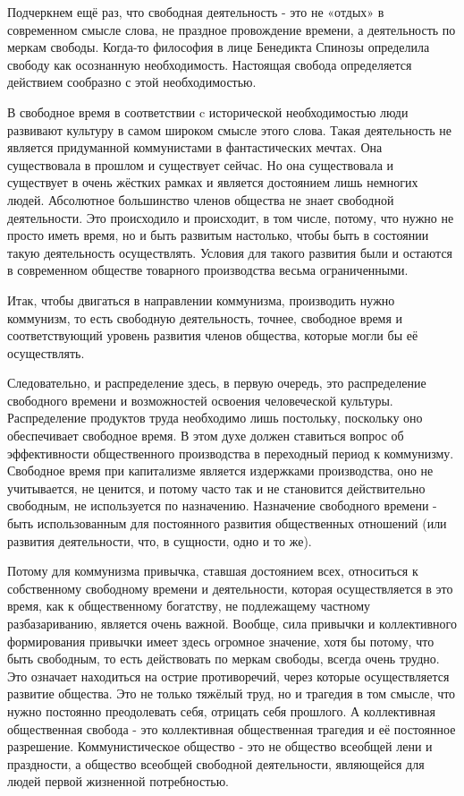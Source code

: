 \documentclass[12pt,a4paper,openany]{book}
\begin{document}
Подчеркнем ещё раз, что свободная деятельность - это не «отдых» в современном смысле слова, не праздное провождение времени, а деятельность по меркам свободы. Когда-то философия в лице Бенедикта Спинозы определила свободу как осознанную необходимость. Настоящая свобода определяется действием сообразно с этой необходимостью.

В свободное время в соответствии c исторической необходимостью люди развивают культуру в самом широком смысле этого слова. Такая деятельность не является придуманной коммунистами в фантастических мечтах. Она существовала в прошлом и существует сейчас. Но она существовала и существует в очень жёстких рамках и является достоянием лишь немногих людей. Абсолютное большинство членов общества не знает свободной деятельности. Это происходило и происходит, в том числе, потому, что нужно не просто иметь время, но и быть развитым настолько, чтобы быть в состоянии такую деятельность осуществлять. Условия для такого развития были и остаются в современном обществе товарного производства весьма ограниченными.

Итак, чтобы двигаться в направлении коммунизма, производить нужно коммунизм, то есть свободную деятельность, точнее, свободное время и соответствующий уровень развития членов общества, которые могли бы её осуществлять.

Следовательно, и распределение здесь, в первую очередь, это распределение свободного времени и возможностей освоения человеческой культуры. Распределение продуктов труда необходимо лишь постольку, поскольку оно обеспечивает свободное время. В этом духе должен ставиться вопрос об эффективности общественного производства в переходный период к коммунизму. Свободное время при капитализме является издержками производства, оно не учитывается, не ценится, и потому часто так и не становится действительно свободным, не используется по назначению. Назначение свободного времени - быть использованным для постоянного развития общественных отношений (или развития деятельности, что, в сущности, одно и то же).

Потому для коммунизма привычка, ставшая достоянием всех, относиться к собственному свободному времени и деятельности, которая осуществляется в это время, как к общественному богатству, не подлежащему частному разбазариванию, является очень важной. Вообще, сила привычки и коллективного формирования привычки имеет здесь огромное значение, хотя бы потому, что быть свободным, то есть действовать по меркам свободы, всегда очень трудно. Это означает находиться на острие противоречий, через которые осуществляется развитие общества. Это не только тяжёлый труд, но и трагедия в том смысле, что нужно постоянно преодолевать себя, отрицать себя прошлого. А коллективная общественная свобода - это коллективная общественная трагедия и её постоянное разрешение. Коммунистическое общество - это не общество всеобщей лени и праздности, а общество всеобщей свободной деятельности, являющейся для людей первой жизненной потребностью.
\end{document}
